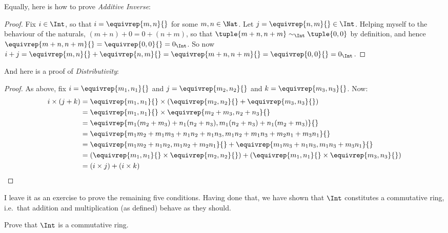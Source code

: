 \documentclass[../../../include/open-logic-section]{subfiles}
\begin{document}
Equally, here is how to prove \emph{Additive Inverse}:
\begin{proof}
	Fix $i \in \Int$, so that $i = \equivrep{m,n}{}$ for some $m, n \in \Nat$. Let $j = \equivrep{n, m}{} \in \Int$. Helping myself to the behaviour of the naturals, $(m+n) + 0 = 0 + (n+m)$, so that $\tuple{m+n, n+m} \sim_\Int \tuple{0,0}$ by definition, and hence $\equivrep{m+n, n+m}{} = \equivrep{0, 0}{} = 0_\Int$. So now $i + j = \equivrep{m,n}{}+\equivrep{n,m}{}=\equivrep{m+n, n+m}{}= \equivrep{0, 0}{} = 0_\Int$.
\end{proof}\noindent
And here is a proof of \emph{Distributivity}:
\begin{proof}
	As above, fix $i = \equivrep{m_1, n_1}{}$ and $j = \equivrep{m_2,n_2}{}$ and $k = \equivrep{m_3, n_3}{}$. Now:
	\begin{align*}
		i \times (j + k) 
		&= \equivrep{m_1, n_1}{} \times (\equivrep{m_2,n_2}{} + \equivrep{m_3, n_3}{})\\
		&= \equivrep{m_1, n_1}{} \times \equivrep{m_2 + m_3,n_2+n_3}{}\\
		&= \equivrep{m_1  (m_2 + m_3) + n_1  (n_2+n_3), m_1  (n_2 + n_3) + n_1 (m_2 + m_3)}{}\\
		&= \equivrep{m_1 m_2 + m_1m_3 + n_1 n_2+n_1n_3, m_1 n_2 + m_1n_3 + m_2n_1 + m_3n_1}{}\\		
		&= \equivrep{m_1m_2 + n_1n_2, m_1n_2 + m_2n_1}{} + \equivrep{m_1m_3 + n_1n_3, m_1n_3 + m_3n_1}{}\\
		&= (\equivrep{m_1, n_1}{} \times \equivrep{m_2,n_2}{}) + (\equivrep{m_1, n_1}{} \times  \equivrep{m_3, n_3}{})\\
		&= (i \times j) + (i \times k)
	\end{align*}
\end{proof}\noindent
I leave it as an exercise to prove the remaining five conditions. Having done that, we have shown that $\Int$ constitutes a commutative ring, i.e.\ that addition and multiplication (as defined) behave as they should. 
\begin{prob}
	Prove that $\Int$ is a commutative ring.
\end{prob}
\end{document}
